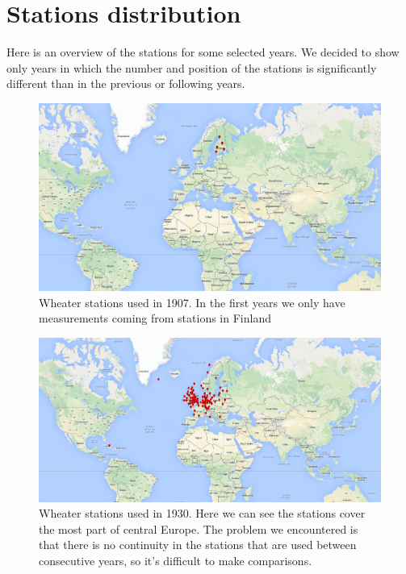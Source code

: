 \documentclass{vldb}
\begin{document}
\newpage
\appendix
\section{Stations distribution} \label{App:AppendixA}
Here is an overview of the stations for some selected years. We decided to show only years in which the number and position of the stations is significantly different than in the previous or following years.

\begin{figure}[tbh]
\includegraphics[width=1\linewidth]{stations1907}
\caption{Wheater stations used in 1907. In the first years we only have measurements coming from stations in Finland}
\label{fig:stations1907}
\end{figure}
\begin{figure}[tbh]
\includegraphics[width=1\linewidth]{stations1930}
\caption{Wheater stations used in 1930. Here we can see the stations cover the most part of central Europe. The problem we encountered is that there is no continuity in the stations that are used between consecutive years, so it's difficult to make comparisons.}
\label{fig:stations1930}
\end{figure}
\end{document}
